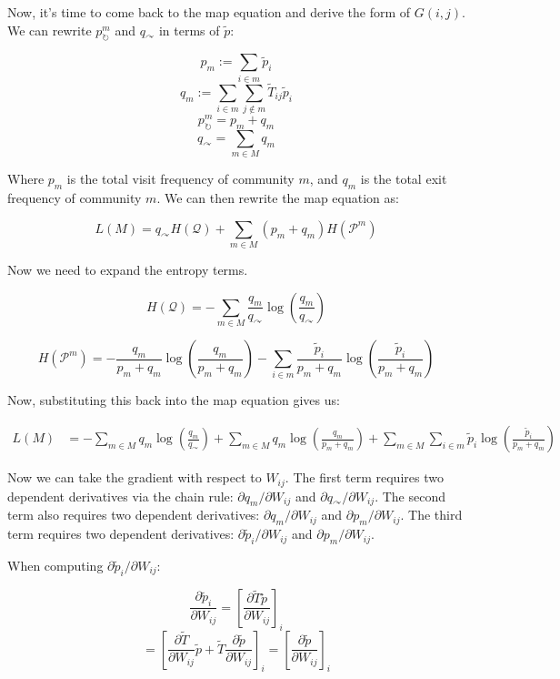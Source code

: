 \documentclass[pdflatex,sn-mathphys-num]{sn-jnl}%
\theoremstyle{thmstyleone}%
\theoremstyle{thmstyletwo}%
\theoremstyle{thmstylethree}%
\begin{document}
Now, it's time to come back to the map equation and derive the form of $G(i, j)$. We can rewrite $p_{\circlearrowright}^m$ and $q_{\curvearrowright}$ in terms of $\tilde{p}$:

$$p_m := \sum_{i \in m} \tilde{p}_i$$
$$q_m := \sum_{i \in m} \sum_{j \notin m} \tilde{T}_{ij} \tilde{p}_i$$
$$p_{\circlearrowright}^m = p_m + q_m$$
$$q_{\curvearrowright} = \sum_{m \in M} q_m$$

Where $p_m$ is the total visit frequency of community $m$, and $q_m$ is the total exit frequency of community $m$. We can then rewrite the map equation as:

$$L(M) = q_{\curvearrowright} H(\mathcal{Q}) + \sum_{m \in M} (p_m + q_m) H(\mathcal{P}^m)$$

Now we need to expand the entropy terms.

$$H(\mathcal{Q}) = -\sum_{m \in M} \frac{q_m}{q_{\curvearrowright}} \log \left( \frac{q_m}{q_{\curvearrowright}} \right)$$

$$H(\mathcal{P}^m) = -\frac{q_m}{p_m + q_m} \log \left( \frac{q_m}{p_m + q_m} \right) - \sum_{i \in m} \frac{\tilde{p}_i}{p_m + q_m} \log \left( \frac{\tilde{p}_i}{p_m + q_m} \right)$$

Now, substituting this back into the map equation gives us:

\begin{align*}
L(M) &= -\sum_{m \in M} q_m \log \left( \frac{q_m}{q_{\curvearrowright}} \right) + \sum_{m \in M} q_m \log \left( \frac{q_m}{p_m + q_m} \right) + \sum_{m \in M} \sum_{i \in m} \tilde{p}_i \log \left( \frac{\tilde{p}_i}{p_m + q_m} \right)
\end{align*}

Now we can take the gradient with respect to $W_{ij}$. The first term requires two dependent derivatives via the chain rule: $\partial q_m / \partial W_{ij}$ and $\partial q_{\curvearrowright} / \partial W_{ij}$. The second term also requires two dependent derivatives: $\partial q_m / \partial W_{ij}$ and $\partial p_m / \partial W_{ij}$. The third term requires two dependent derivatives: $\partial \tilde{p}_i / \partial W_{ij}$ and $\partial p_m / \partial W_{ij}$.

When computing $\partial \tilde{p}_i / \partial W_{ij}$:

$$\frac{\partial \tilde{p}_i}{\partial W_{ij}} = \left[\frac{\partial \tilde{T}\tilde{p}}{\partial W_{ij}}\right]_i$$
$$= \left[\frac{\partial \tilde{T}}{\partial W_{ij}} \tilde{p} + \tilde{T} \frac{\partial \tilde{p}}{\partial W_{ij}}\right]_i = \left[\frac{\partial \tilde{p}}{\partial W_{ij}}\right]_i$$
\end{document}
